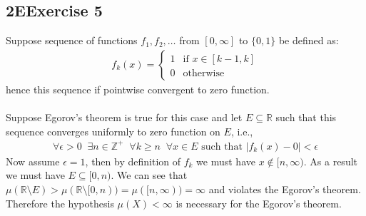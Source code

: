 \documentclass[12pt, letterpaper]{article}
\newcommand{\Z}{\mathbb{Z}}
\newcommand{\R}{\mathbb{R}}
\begin{document}
\subsection*{2\hspace{1pt}E\hspace{20pt}Exercise 5}
Suppose sequence of functions $f_1, f_2, \dots$ from $[0,\infty]$ to $\{0,1\}$ be defined as:
\begin{align*}
    f_k(x)=
    \begin{cases} 
     1 & \text{if }x\in [k-1, k] \\
     0 & \text{otherwise} 
   \end{cases}
\end{align*}
hence this sequence if pointwise convergent to zero function.\\\\
Suppose Egorov's theorem is true for this case and let $E\subseteq\R$ such that this sequence converges uniformly to zero function on $E$, i.e.,
\begin{align*}
    \forall\epsilon>0\;\; \exists n\in\Z^+\;\; \forall k\geq n\;\; \forall x\in E \text{ such that } |f_k(x)-0|<\epsilon
\end{align*}
Now assume $\epsilon=1$, then by definition of $f_k$ we must have $x\notin[n, \infty)$. As a result we must have $E\subseteq [0,n)$. We can see that $\mu(\R\setminus E)>\mu(\R\setminus[0,n))=\mu([n, \infty))=\infty$ and violates the Egorov's theorem. Therefore the hypothesis $\mu(X)<\infty$ is necessary for the Egorov's theorem.
\clearpage
\end{document}
